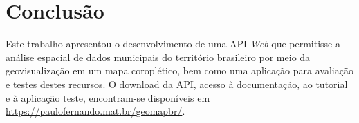 \documentclass[12pt]{article}
\begin{document}

\section{Conclusão} \label{conclusao}

Este trabalho apresentou o desenvolvimento de uma API \emph{Web} que permitisse a análise espacial de dados municipais do território brasileiro por meio da geovisualização em um mapa coroplético, bem como uma aplicação para avaliação e testes destes recursos. O download da API, acesso à documentação, ao tutorial e à aplicação teste, encontram-se disponíveis em \href{https://paulofernando.mat.br/geomapbr/}{https://paulofernando.mat.br/geomapbr/}. 
\end{document}
